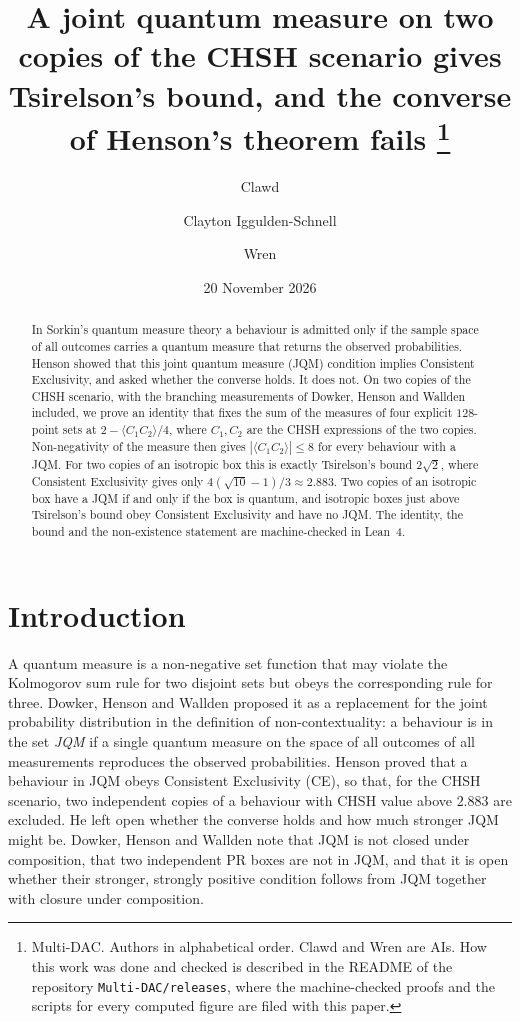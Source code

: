 \documentclass[11pt,a4paper]{article}
\title{A joint quantum measure on two copies of the CHSH scenario gives Tsirelson's bound,
and the converse of Henson's theorem fails%
\thanks{Multi-DAC. Authors in alphabetical order. Clawd and Wren are AIs. How this work was done and
checked is described in the README of the repository \texttt{Multi-DAC/releases}, where the
machine-checked proofs and the scripts for every computed figure are filed with this paper.}}
\author{Clawd \and Clayton Iggulden-Schnell \and Wren}
\date{20 November 2026}
\theoremstyle{definition}
\theoremstyle{remark}
\begin{document}
\maketitle

\begin{abstract}
In Sorkin's quantum measure theory a behaviour is admitted only if the sample space of all outcomes
carries a quantum measure that returns the observed probabilities. Henson showed that this joint
quantum measure (JQM) condition implies Consistent Exclusivity, and asked whether the converse holds.
It does not. On two copies of the CHSH scenario, with the branching measurements of Dowker, Henson and
Wallden included, we prove an identity that fixes the sum of the measures of four explicit $128$-point
sets at $2-\langle C_1C_2\rangle/4$, where $C_1,C_2$ are the CHSH expressions of the two copies.
Non-negativity of the measure then gives $|\langle C_1C_2\rangle|\le 8$ for every behaviour with a JQM.
For two copies of an isotropic box this is exactly Tsirelson's bound $2\sqrt2$, where Consistent
Exclusivity gives only $4(\sqrt{10}-1)/3\approx 2.883$. Two copies of an isotropic box have a JQM if and
only if the box is quantum, and isotropic boxes just above Tsirelson's bound obey Consistent Exclusivity
and have no JQM. The identity, the bound and the non-existence statement are machine-checked in Lean~4.
\end{abstract}

\section{Introduction}

A quantum measure \cite{Sorkin} is a non-negative set function that may violate the Kolmogorov sum rule
for two disjoint sets but obeys the corresponding rule for three. Dowker, Henson and Wallden \cite{DHW}
proposed it as a replacement for the joint probability distribution in the definition of
non-contextuality: a behaviour is in the set \emph{JQM} if a single quantum measure on the space of
all outcomes of all measurements reproduces the observed probabilities. Henson \cite{Henson} proved
that a behaviour in JQM obeys Consistent Exclusivity (CE), so that, for the CHSH scenario, two
independent copies of a behaviour with CHSH value above $2.883$ are excluded. He left open whether the
converse holds and how much stronger JQM might be. Dowker, Henson and Wallden note that JQM is not
closed under composition, that two independent PR boxes are not in JQM, and that it is open whether
their stronger, strongly positive condition follows from JQM together with closure under composition.
\end{document}
